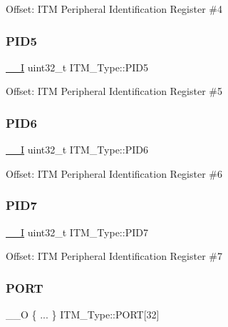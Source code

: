 Offset\+: I\+TM Peripheral Identification Register \#4 \mbox{\label{struct_i_t_m___type_a9353055ceb7024e07d59248e54502cb9}} 
\subsubsection{\texorpdfstring{PID5}{PID5}}
{\footnotesize\ttfamily \mbox{\hyperlink{group___c_m_s_i_s___c_m3__core__definitions_gaf63697ed9952cc71e1225efe205f6cd3}{\+\_\+\+\_\+I}} uint32\+\_\+t I\+T\+M\+\_\+\+Type\+::\+P\+I\+D5}

Offset\+: I\+TM Peripheral Identification Register \#5 \mbox{\label{struct_i_t_m___type_a755c0ec919e7dbb5f7ff05c8b56a3383}} 
\subsubsection{\texorpdfstring{PID6}{PID6}}
{\footnotesize\ttfamily \mbox{\hyperlink{group___c_m_s_i_s___c_m3__core__definitions_gaf63697ed9952cc71e1225efe205f6cd3}{\+\_\+\+\_\+I}} uint32\+\_\+t I\+T\+M\+\_\+\+Type\+::\+P\+I\+D6}

Offset\+: I\+TM Peripheral Identification Register \#6 \mbox{\label{struct_i_t_m___type_aa31ca6bb4b749201321b23d0dbbe0704}} 
\subsubsection{\texorpdfstring{PID7}{PID7}}
{\footnotesize\ttfamily \mbox{\hyperlink{group___c_m_s_i_s___c_m3__core__definitions_gaf63697ed9952cc71e1225efe205f6cd3}{\+\_\+\+\_\+I}} uint32\+\_\+t I\+T\+M\+\_\+\+Type\+::\+P\+I\+D7}

Offset\+: I\+TM Peripheral Identification Register \#7 \mbox{\label{struct_i_t_m___type_a39a41c83803bf267d48b8fe6679dc854}} 
\subsubsection{\texorpdfstring{PORT}{PORT}}
{\footnotesize\ttfamily \+\_\+\+\_\+O \{ ... \}    I\+T\+M\+\_\+\+Type\+::\+P\+O\+RT\mbox{[}32\mbox{]}}

